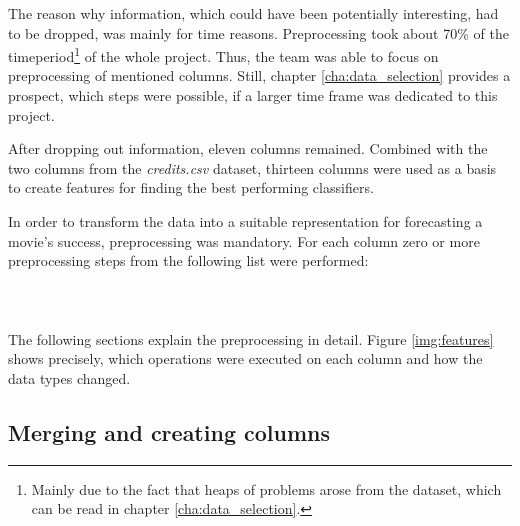 The reason why information, which could have been potentially interesting, had to be dropped, was mainly for time reasons. Preprocessing took about 70\% of the timeperiod\footnote{Mainly due to the fact that heaps of problems arose from the dataset, which can be read in chapter \ref{cha:data_selection}.} of the whole project. Thus, the team was able to focus on preprocessing of mentioned columns. Still, chapter \ref{cha:data_selection} provides a prospect, which steps were possible, if a larger time frame was dedicated to this project.

After dropping out information, eleven columns remained. Combined with the two columns from the \textit{credits.csv} dataset, thirteen columns were used as a basis to create features for finding the best performing classifiers.

In order to transform the data into a suitable representation for forecasting a movie's success, preprocessing was mandatory. For each column zero or more preprocessing steps from the following list were performed:
\\ \\
\\ \\
The following sections explain the preprocessing in detail. Figure \ref{img:features} shows precisely, which operations were executed on each column and how the data types changed.


\subsection{Merging and creating columns}
\label{sec:merge_create}



